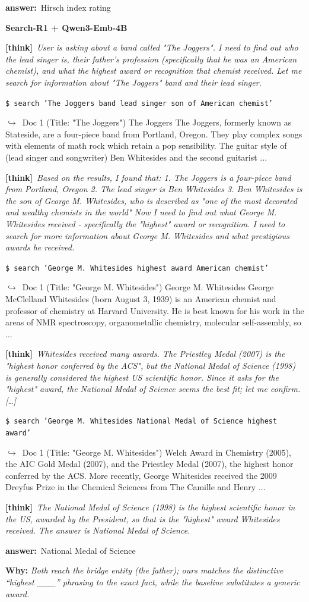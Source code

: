 \documentclass{llmxive}
\providecommand{\xmark}{\ding{55}}
\providecommand{\winbadge}{\colorbox{green!50!black}{\scriptsize\bfseries\,WIN\,}}
\providecommand{\thk}[1]{{\footnotesize\textbf{[think]}\ \textit{#1}\par}}
\providecommand{\cmd}[1]{{\footnotesize\texttt{\$\ #1}\par}}
\providecommand{\retr}[1]{{\footnotesize\quad$\hookrightarrow$\ #1\par}}
\providecommand{\ans}[1]{{\footnotesize\textbf{answer:}\ #1\par}}
\begin{document}
\begin{cmpbox}[label={ex:hotpot-joggers},title={\winbadge\ \ \textsc{HotpotQA -- multi-hop bridge + distinctive phrase}}]
  \ans{Hirsch index rating}
\smallskip\par\textbf{Search-R1 + Qwen3-Emb-4B}~\xmark\par
  \thk{User is asking about a band called "The Joggers". I need to find out who the lead singer is, their father's profession (specifically that he was an American chemist), and what the highest award or recognition that chemist received. Let me search for information about "The Joggers" band and their lead singer.}
  \cmd{search 'The Joggers band lead singer son of American chemist'}
  \retr{Doc 1 (Title: "The Joggers") The Joggers The Joggers, formerly known as Stateside, are a four-piece band from Portland, Oregon. They play complex songs with elements of math rock which retain a pop sensibility. The guitar style of (lead singer and songwriter) Ben Whitesides and the second guitarist ...}
  \thk{Based on the results, I found that: 1. The Joggers is a four-piece band from Portland, Oregon 2. The lead singer is Ben Whitesides 3. Ben Whitesides is the son of George M. Whitesides, who is described as "one of the most decorated and wealthy chemists in the world" Now I need to find out what George M. Whitesides received - specifically the "highest" award or recognition. I need to search for more information about George M. Whitesides and what prestigious awards he received.}
  \cmd{search 'George M. Whitesides highest award American chemist'}
  \retr{Doc 1 (Title: "George M. Whitesides") George M. Whitesides George McClelland Whitesides (born August 3, 1939) is an American chemist and professor of chemistry at Harvard University. He is best known for his work in the areas of NMR spectroscopy, organometallic chemistry, molecular self-assembly, so ...}
  \thk{Whitesides received many awards. The Priestley Medal (2007) is the "highest honor conferred by the ACS", but the National Medal of Science (1998) is generally considered the highest US scientific honor. Since it asks for the "highest" award, the National Medal of Science seems the best fit; let me confirm. […]}
  \cmd{search 'George M. Whitesides National Medal of Science highest award'}
  \retr{Doc 1 (Title: "George M. Whitesides") Welch Award in Chemistry (2005), the AIC Gold Medal (2007), and the Priestley Medal (2007), the highest honor conferred by the ACS. More recently, George Whitesides received the 2009 Dreyfus Prize in the Chemical Sciences from The Camille and Henry ...}
  \thk{The National Medal of Science (1998) is the highest scientific honor in the US, awarded by the President, so that is the "highest" award Whitesides received. The answer is National Medal of Science.}
  \ans{National Medal of Science}
\smallskip\par\textbf{Why:} \textit{Both reach the bridge entity (the father); ours matches the distinctive ``highest \_\_\_'' phrasing to the exact fact, while the baseline substitutes a generic award.}
\end{cmpbox}\bigskip
\end{document}
